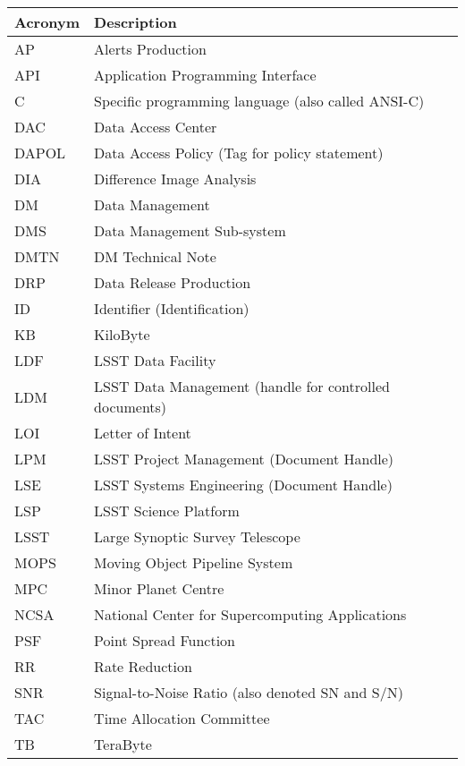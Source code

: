 \addtocounter{table}{-1}
\begin{longtable}{|l|p{}|}\hline
\textbf{Acronym} & \textbf{Description}  \\\hline

AP & Alerts Production \\\hline
API & Application Programming Interface \\\hline
C & Specific programming language (also called ANSI-C) \\\hline
DAC & Data Access Center \\\hline
DAPOL & Data Access Policy (Tag for policy statement) \\\hline
DIA & Difference Image Analysis \\\hline
DM & Data Management \\\hline
DMS & Data Management Sub-system \\\hline
DMTN & DM Technical Note \\\hline
DRP & Data Release Production \\\hline
ID & Identifier (Identification) \\\hline
KB & KiloByte \\\hline
LDF & LSST Data Facility \\\hline
LDM & LSST Data Management (handle for controlled documents) \\\hline
LOI & Letter of Intent \\\hline
LPM & LSST Project Management (Document Handle) \\\hline
LSE & LSST Systems Engineering (Document Handle) \\\hline
LSP & LSST Science Platform \\\hline
LSST & Large Synoptic Survey Telescope \\\hline
MOPS & Moving Object Pipeline System \\\hline
MPC & Minor Planet Centre \\\hline
NCSA & National Center for Supercomputing Applications \\\hline
PSF & Point Spread Function \\\hline
RR & Rate Reduction \\\hline
SNR & Signal-to-Noise Ratio (also denoted SN and S/N) \\\hline
TAC & Time Allocation Committee \\\hline
TB & TeraByte \\\hline
\end{longtable}
